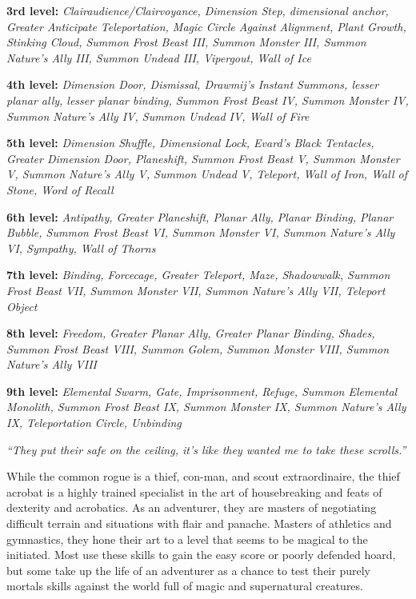 \documentclass[10pt]{article}
\newcommand{\ability}[2]{\smallskip \noindent \textbf{#1} #2}
\newcommand{\classname}[1]{\noindent{\huge \textbf{#1}}}
\newcommand{\quot}[1]{\emph{#1}\medskip}
\newcommand{\desc}[1]{#1 \medskip}
\begin{document}
\ability{3rd level:}{\emph{Clairaudience/Clairvoyance, Dimension Step, dimensional anchor, Greater Anticipate Teleportation, Magic Circle Against Alignment, Plant Growth, Stinking Cloud, Summon Frost Beast III, Summon Monster III, Summon Nature's Ally III, Summon Undead III, Vipergout, Wall of Ice}}

\ability{4th level:}{\emph{Dimension Door, Dismissal, Drawmij's Instant Summons, lesser planar ally, lesser planar binding, Summon Frost Beast IV, Summon Monster IV, Summon Nature's Ally IV, Summon Undead IV, Wall of Fire}}

\ability{5th level:}{\emph{Dimension Shuffle, Dimensional Lock, Evard's Black Tentacles, Greater Dimension Door, Planeshift, Summon Frost Beast V, Summon Monster V, Summon Nature's Ally V, Summon Undead V, Teleport, Wall of Iron, Wall of Stone, Word of Recall}}

\ability{6th level:}{\emph{Antipathy, Greater Planeshift, Planar Ally, Planar Binding, Planar Bubble, Summon Frost Beast VI, Summon Monster VI, Summon Nature's Ally VI, Sympathy, Wall of Thorns}}

\ability{7th level:}{\emph{Binding, Forcecage, Greater Teleport, Maze, Shadowwalk, Summon Frost Beast VII, Summon Monster VII, Summon Nature's Ally VII, Teleport Object}}

\ability{8th level:}{\emph{Freedom, Greater Planar Ally, Greater Planar Binding, Shades, Summon Frost Beast VIII, Summon Golem, Summon Monster VIII, Summon Nature's Ally VIII}}

\ability{9th level:}{\emph{Elemental Swarm, Gate, Imprisonment, Refuge, Summon Elemental Monolith, Summon Frost Beast IX, Summon Monster IX, Summon Nature's Ally IX, Teleportation Circle, Unbinding}}

\newpage


\classname{Thief Acrobat}

\quot{``They put their safe on the ceiling, it's like they wanted me to take these scrolls.''}

\desc{While the common rogue is a thief, con-man, and scout extraordinaire, the thief acrobat is a highly trained specialist in the art of housebreaking and feats of dexterity and acrobatics. As an adventurer, they are masters of negotiating difficult terrain and situations with flair and panache. Masters of athletics and gymnastics, they hone their art to a level that seems to be magical to the initiated. Most use these skills to gain the easy score or poorly defended hoard, but some take up the life of an adventurer as a chance to test their purely mortals skills against the world full of magic and supernatural creatures.}
\end{document}
